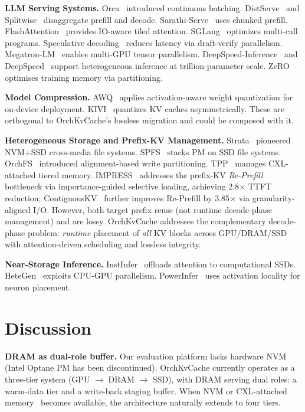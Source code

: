 \documentclass[conference]{IEEEtran}
\begin{document}
\textbf{LLM Serving Systems.} Orca~\cite{orca} introduced continuous batching. DistServe~\cite{distserve} and Splitwise~\cite{splitwise} disaggregate prefill and decode. Sarathi-Serve~\cite{sarathi} uses chunked prefill. FlashAttention~\cite{flashattn,flashattn2} provides IO-aware tiled attention. SGLang~\cite{sglang} optimizes multi-call programs. Speculative decoding~\cite{speculative} reduces latency via draft-verify parallelism. Megatron-LM~\cite{megatron} enables multi-GPU tensor parallelism. DeepSpeed-Inference~\cite{deepspeed-inf} and DeepSpeed~\cite{deepspeed} support heterogeneous inference at trillion-parameter scale. ZeRO~\cite{zero} optimises training memory via partitioning.

\textbf{Model Compression.} AWQ~\cite{awq} applies activation-aware weight quantization for on-device deployment. KIVI~\cite{kivi} quantizes KV caches asymmetrically. These are orthogonal to OrchKvCache's lossless migration and could be composed with it.

\textbf{Heterogeneous Storage and Prefix-KV Management.} Strata~\cite{strata} pioneered NVM+SSD cross-media file systems. SPFS~\cite{spfs} stacks PM on SSD file systems. OrchFS~\cite{orchfs} introduced alignment-based write partitioning. TPP~\cite{tpp} manages CXL-attached tiered memory. IMPRESS~\cite{impress} addresses the prefix-KV \emph{Re-Prefill} bottleneck via importance-guided selective loading, achieving 2.8$\times$ TTFT reduction; ContiguousKV~\cite{contiguouskv} further improves Re-Prefill by 3.85$\times$ via granularity-aligned I/O. However, both target prefix reuse (not runtime decode-phase management) and are lossy. OrchKvCache addresses the complementary decode-phase problem: \emph{runtime} placement of \emph{all} KV blocks across GPU/DRAM/SSD with attention-driven scheduling and lossless integrity.

\textbf{Near-Storage Inference.} InstInfer~\cite{instinfer} offloads attention to computational SSDs. HeteGen~\cite{hetegen} exploits CPU-GPU parallelism. PowerInfer~\cite{powerinfer} uses activation locality for neuron placement.

\section{Discussion}
\label{sec:discussion}

\textbf{DRAM as dual-role buffer.} Our evaluation platform lacks hardware NVM (Intel Optane PM has been discontinued). OrchKvCache currently operates as a three-tier system (GPU $\to$ DRAM $\to$ SSD), with DRAM serving dual roles: a warm-data tier and a write-back staging buffer. When NVM or CXL-attached memory~\cite{tpp} becomes available, the architecture naturally extends to four tiers.
\end{document}
